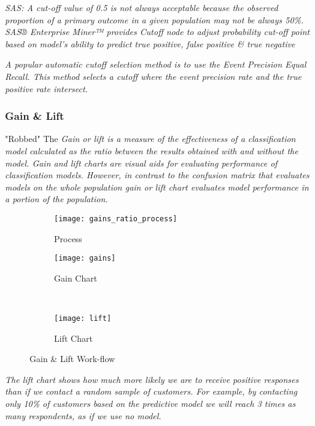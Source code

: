 \textit{SAS: A cut-off value of 0.5 is not always acceptable because the observed proportion of a primary outcome in a given population may not be always 50\%. SAS® Enterprise Miner™ provides Cutoff node to adjust probability cut-off point based on model’s ability to predict true positive, false positive \& true negative}

\textit{
A popular automatic cutoff selection method is to use the Event Precision Equal Recall. This method selects a cutoff where the event precision rate and the true positive rate intersect.
}

\subsubsection{Gain \& Lift}
"Robbed" The
\textit{Gain or lift is a measure of the effectiveness of a classification model calculated as the ratio between the results obtained with and without the model. Gain and lift charts are visual aids for evaluating performance of classification models. However, in contrast to the confusion matrix that evaluates models on the whole population gain or lift chart evaluates model performance in a portion of the population. }

\begin{figure}[H]
	\centering
	\begin{subfigure}[b]{0.90\textwidth}
		\captionsetup{font=scriptsize}
		\texttt{[image: gains\_ratio\_process]}\caption{Process}\label{fig:gains_ratio_process}
	\end{subfigure} 
	\medskip
	\newline
	\begin{subfigure}[b]{0.45\textwidth}
		\captionsetup{font=scriptsize}
		\texttt{[image: gains]}
		\caption{Gain Chart}\label{fig:gains}
	\end{subfigure} ~\quad
	\begin{subfigure}[b]{0.45\textwidth}
		\captionsetup{font=scriptsize}
		\texttt{[image: lift]}
		\caption{Lift Chart}\label{fig:lift}
	\end{subfigure}
	\caption{Gain \& Lift Work-flow}
	\label{fig:unbal_corr_analysis}
\end{figure}

\textit{The lift chart shows how much more likely we are to receive positive responses than if we contact a random sample of customers. For example, by contacting only 10\% of customers based on the predictive model we will reach 3 times as many respondents, as if we use no model.}

